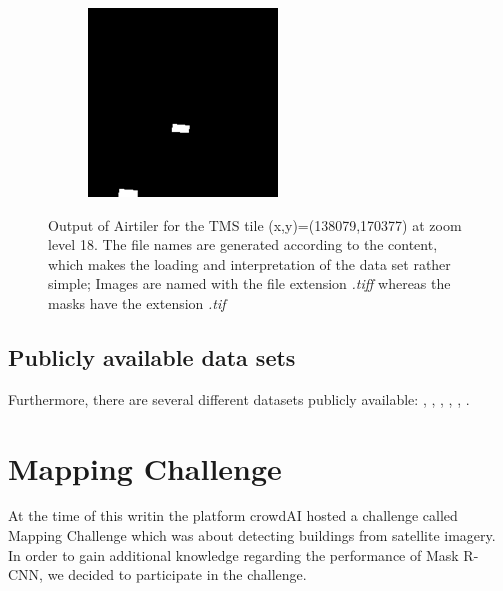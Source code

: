 \begin{figure}[H]
\begin{subfigure}[b]{0.475\textwidth}
            \includegraphics[width=\textwidth]{chapters/theoretical_and_experimental_results/images/18_138079_170377_swimming_pool.png}
            \caption{}
            \label{fig:results:airtiler_output_pool}
        \end{subfigure}
        \caption{Output of Airtiler for the TMS tile (x,y)=(138079,170377) at zoom level 18. The file names are generated according to the content, which makes the loading and interpretation of the data set rather simple; Images are named with the file extension \textit{.tiff} whereas the masks have the extension \textit{.tif}}
        \label{fig:results:airtiler_output_description}
    \end{figure}

\subsection{Publicly available data sets}
Furthermore, there are several different datasets publicly available: \cite{VolodymyrMnih.2013}, \cite{spacenet}, \cite{isprs-vaihingen}, \cite{isprs-potsdam}, \cite{Helber.20170831}, \cite{deepsat}.

\section{Mapping Challenge}
At the time of this writin the platform crowdAI hosted a challenge called Mapping Challenge \cite{mappingchallenge} which was about detecting buildings from satellite imagery. In order to gain additional knowledge regarding the performance of Mask R-CNN, we decided to participate in the challenge.

